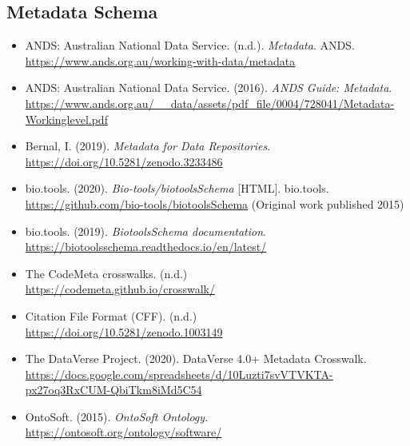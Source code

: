 \documentclass[11pt]{article}
\begin{document}
\vspace*{-2pt}
\subsection{Metadata Schema}
\label{metadata-schema}

\begin{itemize}

\item ANDS: Australian National Data Service. (n.d.). \emph{Metadata}. ANDS.\\
\url{https://www.ands.org.au/working-with-data/metadata}

\item ANDS: Australian National Data Service. (2016). \emph{ANDS Guide: Metadata}.\\
\url{https://www.ands.org.au/__data/assets/pdf_file/0004/728041/Metadata-Workinglevel.pdf}

\item Bernal, I. (2019). \emph{Metadata for Data Repositories}.\\
\url{https://doi.org/10.5281/zenodo.3233486}

\item bio.tools. (2020). \emph{Bio-tools/biotoolsSchema} {[}HTML{]}. bio.tools.\\
\url{https://github.com/bio-tools/biotoolsSchema}
(Original work published 2015)

\item bio.tools. (2019). \emph{BiotoolsSchema documentation}.\\
\url{https://biotoolsschema.readthedocs.io/en/latest/}

\item The CodeMeta crosswalks. (n.d.)\\
\url{https://codemeta.github.io/crosswalk/}

\item Citation File Format (CFF). (n.d.)\\
\url{https://doi.org/10.5281/zenodo.1003149}

\item The DataVerse Project. (2020). DataVerse 4.0+ Metadata Crosswalk.\\
\url{https://docs.google.com/spreadsheets/d/10Luzti7svVTVKTA-px27oq3RxCUM-QbiTkm8iMd5C54}

\item OntoSoft. (2015). \emph{OntoSoft Ontology}.\\
\url{https://ontosoft.org/ontology/software/}


\end{itemize}
\end{document}
